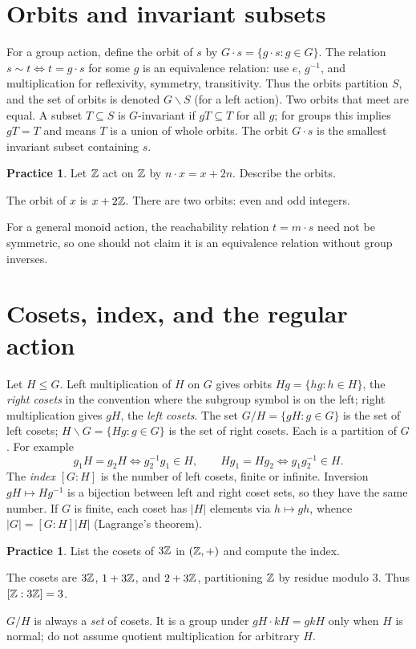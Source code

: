 \documentclass[11pt,openany]{book}
\theoremstyle{definition}
\newtheorem{exercise}[theorem]{Practice}
\begin{document}
\section{Orbits and invariant subsets}
For a group action, define the orbit of $s$ by $G\cdot s=\{g\cdot s:g\in G\}$. The relation $s\sim t\iff t=g\cdot s$ for some $g$ is an equivalence relation: use $e$, $g^{-1}$, and multiplication for reflexivity, symmetry, transitivity. Thus the orbits partition $S$, and the set of orbits is denoted $G\backslash S$ (for a left action). Two orbits that meet are equal. A subset $T\subseteq S$ is $G$-invariant if $gT\subseteq T$ for all $g$; for groups this implies $gT=T$ and means $T$ is a union of whole orbits. The orbit $G\cdot s$ is the smallest invariant subset containing $s$.
\begin{exercise}Let $\mathbb Z$ act on $\mathbb Z$ by $n\cdot x=x+2n$. Describe the orbits.\end{exercise}
\begin{solution}The orbit of $x$ is $x+2\mathbb Z$. There are two orbits: even and odd integers.\end{solution}
For a general monoid action, the reachability relation $t=m\cdot s$ need not be symmetric, so one should not claim it is an equivalence relation without group inverses.

\section{Cosets, index, and the regular action}
Let $H\le G$. Left multiplication of $H$ on $G$ gives orbits $Hg=\{hg:h\in H\}$, the \emph{right cosets} in the convention where the subgroup symbol is on the left; right multiplication gives $gH$, the \emph{left cosets}. The set $G/H=\{gH:g\in G\}$ is the set of left cosets; $H\backslash G=\{Hg:g\in G\}$ is the set of right cosets. Each is a partition of $G$. For example
\[g_1H=g_2H\iff g_2^{-1}g_1\in H,\qquad Hg_1=Hg_2\iff g_1g_2^{-1}\in H.\]
The \emph{index} $[G:H]$ is the number of left cosets, finite or infinite. Inversion $gH\mapsto Hg^{-1}$ is a bijection between left and right coset sets, so they have the same number. If $G$ is finite, each coset has $|H|$ elements via $h\mapsto gh$, whence $|G|=[G:H]|H|$ (Lagrange's theorem).
\begin{exercise}List the cosets of $3\mathbb Z$ in $(\mathbb Z,+)$ and compute the index.\end{exercise}
\begin{solution}The cosets are $3\mathbb Z$, $1+3\mathbb Z$, and $2+3\mathbb Z$, partitioning $\mathbb Z$ by residue modulo $3$. Thus $[\mathbb Z:3\mathbb Z]=3$.\end{solution}
\begin{warningbox}$G/H$ is always a \emph{set} of cosets. It is a group under $gH\cdot kH=gkH$ only when $H$ is normal; do not assume quotient multiplication for arbitrary $H$.\end{warningbox}
\end{document}
